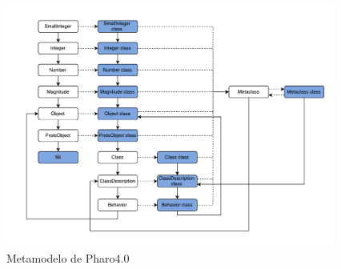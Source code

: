 \begin{figure}[H]
  \begin{center}
  \includegraphics[height=300px]{images/metamodelo_smalltalk.pdf}
  \end{center}
  \caption{Metamodelo de Pharo4.0}
  \label{fig:metamodelo_pharo}
\end{figure}

